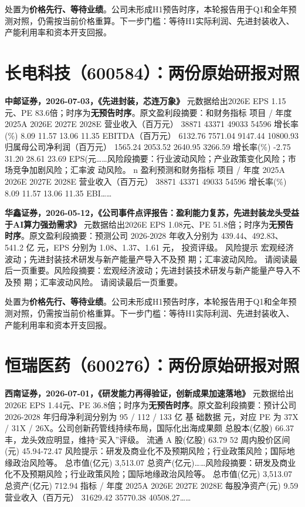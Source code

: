 \begin{keyinsight}[AStock处理]
处置为\textbf{价格先行、等待业绩}。公司未形成H1预告时序，本轮报告用于Q1和全年预测对照，仍需按当前价格重算。下一步门槛：等待H1实际利润、先进封装收入、产能利用率和资本开支回报。
\end{keyinsight}

\section{长电科技（600584）：两份原始研报对照}

\textbf{中邮证券，2026-07-03，《先进封装，芯连万象》}
元数据给出2026E EPS 1.15元、PE 83.6倍；时序为\textbf{无预告时序}。原文盈利段摘要：和财务指标 项目 / 年度 2025A 2026E 2027E 2028E 营业收入（百万元） 38871 43371 49033 54596 增长率(\%) 8.09 11.57 13.06 11.35 EBITDA（百万元） 6132.76 7571.04 9147.44 10800.93 归属母公司净利润（百万元） 1565.24 2053.52 2640.95 3266.59 增长率(\%) -2.75 31.20 28.61 23.69 EPS(元……风险段摘要：行业波动风险；产业政策变化风险；市场竞争加剧风险；汇率波 动风险。 n 盈利预测和财务指标 项目 / 年度 2025A 2026E 2027E 2028E 营业收入（百万元） 38871 43371 49033 54596 增长率(\%) 8.09 11.57 13.06 11.35 EBI……

\textbf{华鑫证券，2026-05-12，《公司事件点评报告：盈利能力复苏，先进封装龙头受益于AI算力强劲需求》}
元数据给出2026E EPS 1.08元、PE 51.8倍；时序为\textbf{无预告时序}。原文盈利段摘要：预测公司 2026-2028 年收入分别为 439.44、492.83、541.2 亿 元，EPS 分别为 1.08、1.37、1.61 元， 投资评级。 风险提示 宏观经济波动；先进封装技术研发与新产能量产导入不及预 期；汇率波动风险。 请阅读最后一页重要。风险段摘要：宏观经济波动；先进封装技术研发与新产能量产导入不及预 期；汇率波动风险。 请阅读最后一页重要。

\begin{keyinsight}[AStock处理]
处置为\textbf{价格先行、等待业绩}。公司未形成H1预告时序，本轮报告用于Q1和全年预测对照，仍需按当前价格重算。下一步门槛：等待H1实际利润、先进封装收入、产能利用率和资本开支回报。
\end{keyinsight}

\section{恒瑞医药（600276）：两份原始研报对照}

\textbf{西南证券，2026-07-01，《研发能力再得验证，创新成果加速落地》}
元数据给出2026E EPS 1.44元、PE 36.8倍；时序为\textbf{无预告时序}。原文盈利段摘要：预计公司 2026-2028 年归母净利润分别为 95 / 112 / 133 亿 基 础数据 元，对应 PE 为 37X / 31X / 26X。公司创新药管线持续布局，国际化出海成果颇 总股本(亿股) 66.37 丰，龙头效应明显，维持“买入”评级。 流通 A 股(亿股) 63.79 52 周内股价区间(元) 45.94-72.47 风险提示：研发及商业化不及预期风险；行业政策风险；国际地缘政治风险等。 总市值(亿元) 3,513.07 总资产(亿元)……风险段摘要：研发及商业化不及预期风险；行业政策风险；国际地缘政治风险等。 总市值(亿元) 3,513.07 总资产(亿元) 712.94 指标 / 年度 2025A 2026E 2027E 2028E 每股净资产(元) 9.59 营业收入（百万元） 31629.42 35770.38 40508.27……


